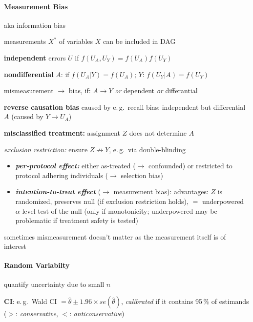 \documentclass[8pt,twoside]{extarticle}
\begin{document}
\begin{multicols}{2}
\paragraph{Measurement Bias} aka information bias 

\noindent measurements $X^*$ of variables $X$ can be included in DAG

\noindent \textbf{independent} errors $U$ if $f(U_A, U_Y) = f(U_A)f(U_Y)$

\noindent \textbf{nondifferential} $A$:  if $f(U_A|Y)=f(U_A)$; $Y$: $f(U_Y|A)=f(U_Y)$

\noindent mismeasurement $\to$ bias, if: $A\to Y$ \textit{or} dependent \textit{or} differantial

\noindent \textbf{reverse causation bias} caused by e.\,g.\ recall bias: independent but differential $A$ (caused by $Y \to U_A$)


\noindent \textbf{misclassified treatment:} assignment $Z$ does not determine $A$

\noindent \textit{exclusion restriction:} ensure  $Z\not\to Y$, e.\,g.\ via double-blinding



\begin{itemize}[itemsep=0em, topsep=0pt, partopsep=0pt,parsep=0pt, leftmargin=1.5em]
\setlength{\itemsep}{0pt}%
\setlength{\parskip}{0pt}
\item \textit{\textbf{per-protocol effect:}} either as-treated ($\to$ confounded) or restricted to protocol adhering individuals ($\to$ selection bias)
\item \textit{\textbf{intention-to-treat effect}} ($\to$ measurement bias): advantages: $Z$ is randomized, preserves null (if exclusion restriction holds), $=$ underpowered $\alpha$-level test of the null (only if monotonicity; underpowered may be problematic if treatment safety is tested)
\end{itemize}

\noindent
 sometimes mismeasurement doesn't matter as the measurement itself
 is of interest \citep{hernan2023causal}






\paragraph{Random Variabilty}  quantify uncertainty due to small $n$

\noindent \textbf{CI}: e.\,g.\ Wald CI $=\hat{\theta} \pm 1.96 \times se(\hat{\theta})$, \textit{calibrated} if it contains 95\,\% of estimands ($>$: \textit{conservative}, $<$: \textit{anticonservative})


\end{multicols}
\end{document}
